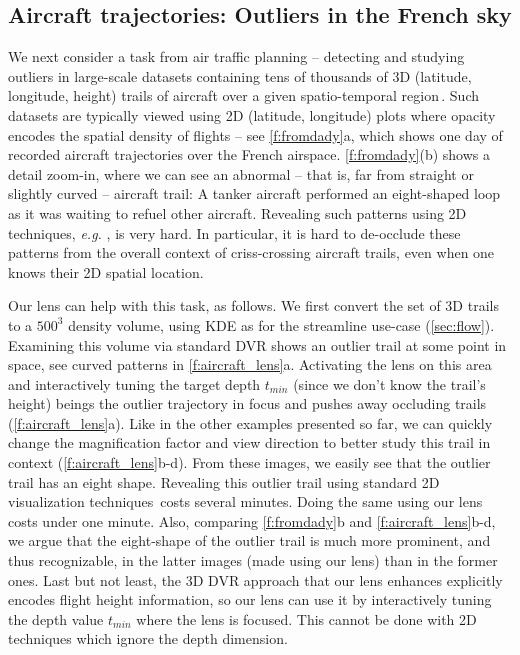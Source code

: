 \subsection{Aircraft trajectories: Outliers in the French sky}
\label{sec:atc}
%
%
We next consider a task from air traffic planning -- detecting and studying outliers in large-scale datasets containing tens of thousands of 3D (latitude, longitude, height) trails of aircraft over a given spatio-temporal region\,\cite{hurter2014interactive}. Such datasets are typically viewed using 2D (latitude, longitude) plots where opacity encodes the spatial density of flights -- see \autoref{f:fromdady}a, which shows one day of recorded aircraft trajectories over the French airspace. \autoref{f:fromdady}(b) shows a detail zoom-in, where we can see an abnormal -- that is, far from straight or slightly curved -- aircraft trail: A tanker aircraft performed an eight-shaped loop as it was waiting to refuel other aircraft. Revealing such patterns using 2D techniques, \emph{e.g.} \cite{hurter2009fromdady}, is very hard. In particular, it is hard to de-occlude these patterns from the overall context of criss-crossing aircraft trails, even when one knows their 2D spatial location.

Our lens can help with this task, as follows. We first convert the set of 3D trails to a $500^3$ density volume, using KDE as for the streamline use-case (\autoref{sec:flow}). Examining this volume via standard DVR shows an outlier trail at some point in space, see curved patterns in \autoref{f:aircraft_lens}a. Activating the lens on this area and interactively tuning the target depth $t_{min}$ (since we don't know the trail's height) beings the outlier trajectory in focus and pushes away occluding trails (\autoref{f:aircraft_lens}a). Like in the other examples presented so far, we can quickly change the magnification factor and view direction to better study this trail in context (\autoref{f:aircraft_lens}b-d). From these images, we easily see that the outlier trail has an eight shape. Revealing this outlier trail using standard 2D visualization techniques\,\cite{hurter2009fromdady} costs several minutes. Doing the same using our lens costs under one minute. Also, comparing \autoref{f:fromdady}b and \autoref{f:aircraft_lens}b-d, we argue that the eight-shape of the outlier trail is much more prominent, and thus recognizable, in the latter images (made using our lens) than in the former ones. Last but not least, the 3D DVR approach that our lens enhances explicitly encodes flight height information, so our lens can use it by interactively tuning the depth value $t_{min}$ where the lens is focused. This cannot be done with 2D techniques which ignore the depth dimension.

